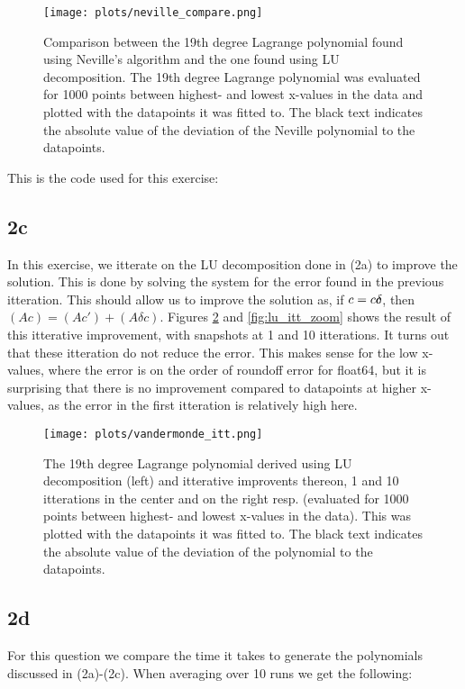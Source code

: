 \begin{figure}
    \centering
    \texttt{[image: plots/neville\_compare.png]}
    \caption{Comparison between the 19th degree Lagrange polynomial found
    using Neville's algorithm and the one found using LU decomposition. The 
    19th degree Lagrange polynomial was evaluated for 1000 points between 
    highest- and lowest x-values in the data and plotted with the datapoints 
    it was fitted to. The black text indicates the absolute value of the 
    deviation of the Neville polynomial to the datapoints.}
    \label{fig:neville}
\end{figure}

\noindent
This is the code used for this exercise:


\subsection*{2c}
In this exercise, we itterate on the LU decomposition done in (2a) to improve
the solution. This is done by solving the system for the error found in the
previous itteration. This should allow us to improve the solution as, if $c=c\mathaccent+\delta c$,
then $(A c)=(A c')+(A \delta c)$.
Figures \ref{fig:lu_itt} and \ref{fig:lu_itt_zoom} shows the result of this itterative improvement, with
snapshots at 1 and 10 itterations.
It turns out that these itteration do not reduce the error. This makes sense for the low x-values, where the error is on the
order of roundoff error for float64, but it is surprising that there is no improvement compared to datapoints at higher x-values,
as the error in the first itteration is relatively high here.

\begin{figure}
    \centering
    \texttt{[image: plots/vandermonde\_itt.png]}
    \caption{The 19th degree Lagrange polynomial derived using LU 
    decomposition (left) and itterative improvents thereon, 1 and 10 
    itterations in the center and on the right resp. (evaluated for 1000 
    points between highest- and lowest x-values in the data). This was 
    plotted with the datapoints it was fitted to. The black text indicates 
    the absolute value of the deviation of the polynomial to the datapoints.}
    \label{fig:lu_itt}
\end{figure}

\subsection*{2d}
For this question we compare the time it takes to generate the polynomials
discussed in (2a)-(2c). When averaging over 10 runs we get the following:

